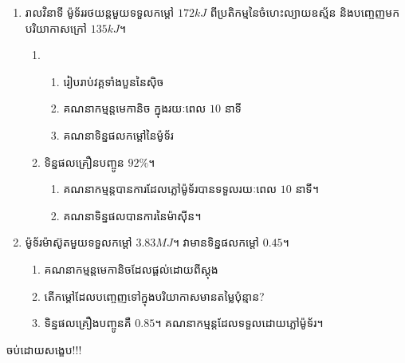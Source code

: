     \begin{example}
    	\begin{enumerate}
    		\item រាលវិនាទី ម៉ូទ័ររថយន្តមួយទទួលកម្តៅ $172kJ$ ពីប្រតិកម្មនៃចំហេះល្យាយឧស្ម័ន និងបញ្ចេញមកបរិយាកាសក្រៅ $135kJ$។
    		\begin{enumerate}[1]
    			\item \begin{enumerate}[k]
    				\item រៀបរាប់វគ្គទាំងបួននៃសុិច
    				\item គណនាកម្មន្តមេកានិច ក្នុងរយៈពេល $10$ នាទី
    				\item គណនាទិន្នផលកម្តៅនៃម៉ូទ័រ
    			\end{enumerate}
    			\item ទិន្នផលគ្រឿនបញ្ចូន $92\%$។
    			\begin{enumerate}[k]
    				\item គណនាកម្មន្តបានការដែលភ្លៅម៉ូទ័របានទទួលរយៈពេល $10$ នាទី។
    				\item គណនាទិន្នផលបានការនៃម៉ាសុីន។
    			\end{enumerate}
    		\end{enumerate}
    		\item ម៉ូទ័រម៉ាស៊ូតមួយទទួលកម្តៅ $3.83MJ$។ វាមានទិន្នផលកម្តៅ $0.45$។
    		\begin{enumerate}
    			\item គណនាកម្មន្តមេកានិចដែលផ្តល់ដោយពីស្តុង
    			\item តើកម្តៅដែលបញ្ចេញទៅក្នុងបរិយាកាសមានតម្លៃប៉ុន្មាន?
    			\item ទិន្នផលគ្រឿងបញ្ចូនគឺ $0.85$។ គណនាកម្មន្តដែលទទួលដោយភ្លៅម៉ូទ័រ។
    		\end{enumerate}
    	\end{enumerate}
    \end{example}
    \begin{center}
    	{\Large \kml\color{blue} ចប់ដោយសង្ខេប!!!}
    \end{center}
	\newpage
